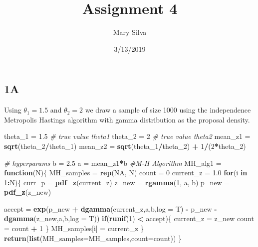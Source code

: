 \documentclass[]{article}
\title{Assignment 4}
\author{Mary Silva}
\date{3/13/2019}
\newenvironment{Shaded}{\begin{snugshade}}{\end{snugshade}}
\newcommand{\KeywordTok}[1]{\textcolor[rgb]{0.13,0.29,0.53}{\textbf{#1}}}
\newcommand{\DataTypeTok}[1]{\textcolor[rgb]{0.13,0.29,0.53}{#1}}
\newcommand{\DecValTok}[1]{\textcolor[rgb]{0.00,0.00,0.81}{#1}}
\newcommand{\FloatTok}[1]{\textcolor[rgb]{0.00,0.00,0.81}{#1}}
\newcommand{\StringTok}[1]{\textcolor[rgb]{0.31,0.60,0.02}{#1}}
\newcommand{\CommentTok}[1]{\textcolor[rgb]{0.56,0.35,0.01}{\textit{#1}}}
\newcommand{\OtherTok}[1]{\textcolor[rgb]{0.56,0.35,0.01}{#1}}
\newcommand{\ControlFlowTok}[1]{\textcolor[rgb]{0.13,0.29,0.53}{\textbf{#1}}}
\newcommand{\OperatorTok}[1]{\textcolor[rgb]{0.81,0.36,0.00}{\textbf{#1}}}
\newcommand{\NormalTok}[1]{#1}
\begin{document}
\maketitle

\subsection{1A}\label{a}

Using \(\theta_1 = 1.5\) and \(\theta_2 = 2\) we draw a sample of size
1000 using the independence Metropolis Hastings algorithm with gamma
distribution as the proposal density.

\begin{Shaded}
\begin{Highlighting}[]
\NormalTok{theta_}\DecValTok{1}\NormalTok{ =}\StringTok{ }\FloatTok{1.5} \CommentTok{# true value theta1}
\NormalTok{theta_}\DecValTok{2}\NormalTok{ =}\StringTok{ }\DecValTok{2} \CommentTok{# true value theta2}
\NormalTok{mean_z1 =}\StringTok{ }\KeywordTok{sqrt}\NormalTok{(theta_}\DecValTok{2}\OperatorTok{/}\NormalTok{theta_}\DecValTok{1}\NormalTok{)}
\NormalTok{mean_z2 =}\StringTok{ }\KeywordTok{sqrt}\NormalTok{(theta_}\DecValTok{1}\OperatorTok{/}\NormalTok{theta_}\DecValTok{2}\NormalTok{) }\OperatorTok{+}\StringTok{ }\DecValTok{1}\OperatorTok{/}\NormalTok{(}\DecValTok{2}\OperatorTok{*}\NormalTok{theta_}\DecValTok{2}\NormalTok{)}

\CommentTok{# hyperparams}
\NormalTok{b =}\StringTok{ }\FloatTok{2.5}
\NormalTok{a =}\StringTok{ }\NormalTok{mean_z1}\OperatorTok{*}\NormalTok{b}
\CommentTok{#M-H Algorithm}
\NormalTok{MH_alg1 =}\StringTok{ }\ControlFlowTok{function}\NormalTok{(N)\{}
\NormalTok{  MH_samples =}\StringTok{ }\KeywordTok{rep}\NormalTok{(}\OtherTok{NA}\NormalTok{, N)}
\NormalTok{  count =}\StringTok{ }\DecValTok{0}
\NormalTok{  current_z =}\StringTok{ }\FloatTok{1.0}
  \ControlFlowTok{for}\NormalTok{(i }\ControlFlowTok{in} \DecValTok{1}\OperatorTok{:}\NormalTok{N)\{}
\NormalTok{    curr_p =}\StringTok{ }\KeywordTok{pdf_z}\NormalTok{(current_z) }
\NormalTok{    z_new =}\StringTok{ }\KeywordTok{rgamma}\NormalTok{(}\DecValTok{1}\NormalTok{, a, b)}
\NormalTok{    p_new =}\StringTok{ }\KeywordTok{pdf_z}\NormalTok{(z_new)}
    
\NormalTok{    accept =}\StringTok{ }\KeywordTok{exp}\NormalTok{(p_new }\OperatorTok{+}\StringTok{ }\KeywordTok{dgamma}\NormalTok{(current_z,a,b,}\DataTypeTok{log =}\NormalTok{ T) }\OperatorTok{-}\StringTok{ }\NormalTok{p_new }\OperatorTok{-}\StringTok{ }\KeywordTok{dgamma}\NormalTok{(z_new,a,b,}\DataTypeTok{log =}\NormalTok{ T))}
    \ControlFlowTok{if}\NormalTok{(}\KeywordTok{runif}\NormalTok{(}\DecValTok{1}\NormalTok{) }\OperatorTok{<}\StringTok{ }\NormalTok{accept)\{}
\NormalTok{      current_z =}\StringTok{ }\NormalTok{z_new}
\NormalTok{      count =}\StringTok{ }\NormalTok{count }\OperatorTok{+}\StringTok{ }\DecValTok{1}
\NormalTok{    \}}
\NormalTok{    MH_samples[i] =}\StringTok{ }\NormalTok{current_z}
\NormalTok{  \}}
  \KeywordTok{return}\NormalTok{(}\KeywordTok{list}\NormalTok{(}\DataTypeTok{MH_samples=}\NormalTok{MH_samples,}\DataTypeTok{count=}\NormalTok{count))}
\NormalTok{\}}
\end{Highlighting}
\end{Shaded}
\end{document}

